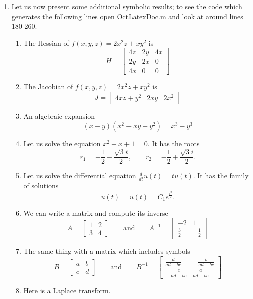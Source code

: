 \documentclass{article}
\begin{document}
\begin{enumerate}
 \item Let us now present  some additional symbolic results; to see the code which
 generates the following lines open \textsf{OctLatexDoc.m} and look at around lines 180-260.
 \begin{enumerate}
 \item The Hessian of \(f(x,y,z)=2 x^{2} z + x y^{2}\) is
 \[
 H=\left[\begin{matrix}4 z & 2 y & 4 x\\2 y & 2 x & 0\\4 x & 0 & 0\end{matrix}\right]
 \]
 \item The Jacobian of \(f(x,y,z)=2 x^{2} z + x y^{2}\) is
 \[
 J=\left[\begin{matrix}4 x z + y^{2} & 2 x y & 2 x^{2}\end{matrix}\right]
 \]
 \item An algebraic expansion
 \[
 \left(x - y\right) \left(x^{2} + x y + y^{2}\right)=x^{3} - y^{3}
 \]
 \item Let us solve the equation \(x^{2} + x + 1 = 0\). It has the roots
 \[
 r_1=- \frac{1}{2} - \frac{\sqrt{3} i}{2}, \qquad r_2=- \frac{1}{2} + \frac{\sqrt{3} i}{2}. 
 \]
 \item Let us solve the differential equation \(\frac{d}{d t} u{\left(t \right)} = t u{\left(t \right)}\). It has the family of solutions
 \[
 u(t)=u{\left(t \right)} = C_{1} e^{\frac{t^{2}}{2}}. 
 \]
 \item We can write a matrix and compute its inverse
 \[
 A=\left[\begin{matrix}1 & 2\\3 & 4\end{matrix}\right] \qquad \text{and} \qquad A^{-1}=\left[\begin{matrix}-2 & 1\\\frac{3}{2} & - \frac{1}{2}\end{matrix}\right]
 \]
 \item The same thing with a matrix which includes symbols
 \[
 B=\left[\begin{matrix}a & b\\c & d\end{matrix}\right] \qquad \text{and} \qquad B^{-1}=\left[\begin{matrix}\frac{d}{a d - b c} & - \frac{b}{a d - b c}\\- \frac{c}{a d - b c} & \frac{a}{a d - b c}\end{matrix}\right]
 \]
 \item Here is a Laplace transform.

\end{enumerate}
\end{enumerate}
\end{document}
